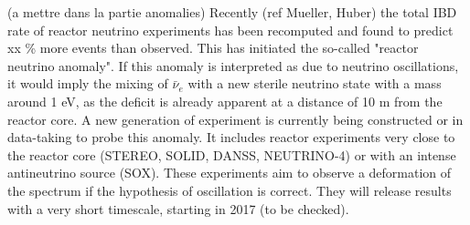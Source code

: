 (a mettre dans la partie anomalies)
Recently (ref Mueller, Huber) the total IBD rate of reactor neutrino experiments has been recomputed and found to predict xx \% more events than observed. This has initiated the so-called "reactor neutrino anomaly". 
If this anomaly is interpreted as due to neutrino oscillations, it would imply the mixing of $\bar{\nu}_e$ with a new sterile neutrino state with a mass around 1 eV, as the deficit is already apparent at a distance of 10 m from the reactor core. 
A new generation of experiment is currently being constructed or in data-taking to probe this anomaly. It includes reactor experiments very close to the reactor core (STEREO, SOLID, DANSS, NEUTRINO-4) or with an intense antineutrino source (SOX). These experiments aim to observe a deformation of the spectrum if the hypothesis of oscillation is correct. They will release results with a very short timescale, starting in 2017 (to be checked).  


